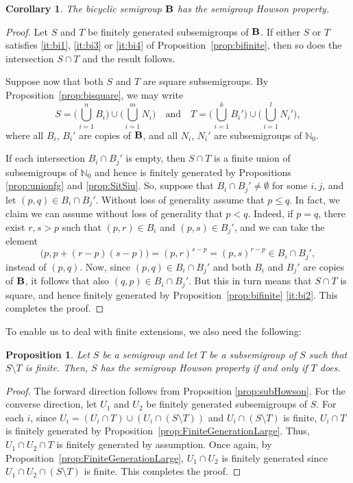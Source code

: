 \documentclass[reqno]{amsart}
\theoremstyle{plain}
\newtheorem{cor}[lem]{Corollary}
\newtheorem{prop}[lem]{Proposition}
\theoremstyle{definition}
\DeclareMathOperator{\B}{\textup{\textbf{B}}}
\numberwithin{equation}{section}
\begin{document}
\begin{cor}
\label{cor:biHowson}
The bicyclic semigroup $\B$ has the semigroup Howson property.
\end{cor}
\begin{proof}
Let $S$ and $T$ be finitely generated subsemigroups of $\B$. If either $S$ or $T$ satisfies \ref{it:bi1}, \ref{it:bi3} or \ref{it:bi4} of Proposition~\ref{prop:bifinite}, then so does the intersection $S\cap T$ and the result follows. 

Suppose now that both $S$ and $T$ are square subsemigroups. By Proposition~\ref{prop:bisquare}, we may write 
\[
S = \Biggl(\bigcup_{i=1}^n B_i\Biggr) \cup \Biggl(\bigcup_{i=1}^m N_i\Biggr)\quad \text{and}\quad T = \Biggl(\bigcup_{i=1}^k B_i'\Biggr)\cup\Biggl(\bigcup_{i=1}^l N_i'\Biggr),
\]
where all $B_i$, $B_i'$ are copies of $\B$, and all $N_i$, $N_i'$ are subsemigroups of $\mathbb{N}_0$. 

If each intersection $B_i\cap B_j'$ is empty, then $S\cap T$ is a finite union of subsemigroups of $\mathbb{N}_0$ and hence
is finitely generated by Propositions \ref{prop:unionfg} and \ref{prop:SitSiu}. So, suppose that $B_i\cap B_j'\neq\emptyset$ for some $i,j$, and let $(p,q)\in B_i\cap B_j'$. Without loss of generality assume that $p\leq q$. In fact, we claim we can assume without loss of generality that $p<q$. Indeed, if $p=q$,
there exist $r,s>p$ such that $(p,r)\in B_i$ and $(p,s)\in B_j'$, and we can take the element
\[
\bigl(p,p+(r-p)(s-p)\bigr)=(p,r)^{s-p}=(p,s)^{r-p}\in B_i\cap B_j',
\]
instead of $(p,q)$. Now, since $(p,q)\in B_i\cap B_j'$ and both $B_i$ and $B_j'$ are copies of $\B$, it follows that also $(q,p)\in B_i\cap B_j'$. But this in turn means that $S\cap T$ is square, and hence finitely generated 
by Proposition~\ref{prop:bifinite} \ref{it:bi2}. This completes the proof.
\end{proof}

To enable us to deal with finite extensions, we also need the following:


\begin{prop}
\label{prop:HowsonFiniteComplement}
Let $S$ be a semigroup and let $T$ be a subsemigroup of $S$ such that $S\setminus T$ is finite. Then, $S$ has the semigroup Howson property if and only if $T$ does.
\end{prop}
\begin{proof}
The forward direction follows from Proposition \ref{prop:subHowson}. For the converse direction, let $U_1$ and $U_2$ be finitely generated subsemigroups of $S$. For each $i$, since $U_i = (U_i\cap T)\cup (U_i\cap (S\setminus T))$ and $U_i\cap (S\setminus T)$ is finite, $U_i\cap T$ is finitely generated by Proposition~\ref{prop:FiniteGenerationLarge}. Thus, $U_1\cap U_2\cap T$ is finitely generated by assumption. 
Once again, by Proposition~\ref{prop:FiniteGenerationLarge}, 
$U_1\cap U_2$ is finitely generated since $U_1\cap U_2\cap (S\setminus T)$ is finite. This completes the proof.
\end{proof}
\end{document}
